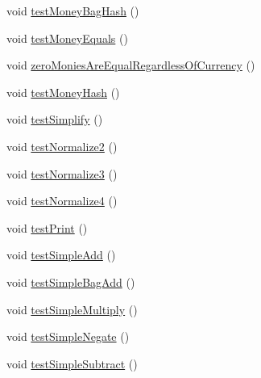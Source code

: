 \begin{DoxyCompactItemize}
\item 
void \mbox{\hyperlink{classes_1_1deusto_1_1testing_1_1junit_1_1_money_perf_test_ab0957dcfa39a4b76414f2ce40cb20c0d}{test\+Money\+Bag\+Hash}} ()
\item 
void \mbox{\hyperlink{classes_1_1deusto_1_1testing_1_1junit_1_1_money_perf_test_a2f32dcc28421475a7ee1b619dfe2facd}{test\+Money\+Equals}} ()
\item 
void \mbox{\hyperlink{classes_1_1deusto_1_1testing_1_1junit_1_1_money_perf_test_a4c6e599bdf0e8b4a28decb276ea915ce}{zero\+Monies\+Are\+Equal\+Regardless\+Of\+Currency}} ()
\item 
void \mbox{\hyperlink{classes_1_1deusto_1_1testing_1_1junit_1_1_money_perf_test_aa767ffb2c597b59ce5ef8bd04326b687}{test\+Money\+Hash}} ()
\item 
void \mbox{\hyperlink{classes_1_1deusto_1_1testing_1_1junit_1_1_money_perf_test_ad40abfb76d9d9055915e5b4e86e047d8}{test\+Simplify}} ()
\item 
void \mbox{\hyperlink{classes_1_1deusto_1_1testing_1_1junit_1_1_money_perf_test_a9a61dc43ae70b7b7d81c601d01c74bda}{test\+Normalize2}} ()
\item 
void \mbox{\hyperlink{classes_1_1deusto_1_1testing_1_1junit_1_1_money_perf_test_a049b2e3b4363eeee54bf91228de0aacd}{test\+Normalize3}} ()
\item 
void \mbox{\hyperlink{classes_1_1deusto_1_1testing_1_1junit_1_1_money_perf_test_a4f892917d21c2469e430f8d9d8560a31}{test\+Normalize4}} ()
\item 
void \mbox{\hyperlink{classes_1_1deusto_1_1testing_1_1junit_1_1_money_perf_test_a08eef6d228585efc624788e89a0cb9de}{test\+Print}} ()
\item 
void \mbox{\hyperlink{classes_1_1deusto_1_1testing_1_1junit_1_1_money_perf_test_ad57f17d866d4079fb2cf74d5c1e8e339}{test\+Simple\+Add}} ()
\item 
void \mbox{\hyperlink{classes_1_1deusto_1_1testing_1_1junit_1_1_money_perf_test_a5f49f59eb07f69ea089b9fb31d824ef3}{test\+Simple\+Bag\+Add}} ()
\item 
void \mbox{\hyperlink{classes_1_1deusto_1_1testing_1_1junit_1_1_money_perf_test_a17f830a95e130a6e96942ace6c5a796f}{test\+Simple\+Multiply}} ()
\item 
void \mbox{\hyperlink{classes_1_1deusto_1_1testing_1_1junit_1_1_money_perf_test_aa4ea485e5cd840f553e587eb9b923c0e}{test\+Simple\+Negate}} ()
\item 
void \mbox{\hyperlink{classes_1_1deusto_1_1testing_1_1junit_1_1_money_perf_test_a5b451d9e084b5074a0ff88ddf1c62106}{test\+Simple\+Subtract}} ()
\end{DoxyCompactItemize}
